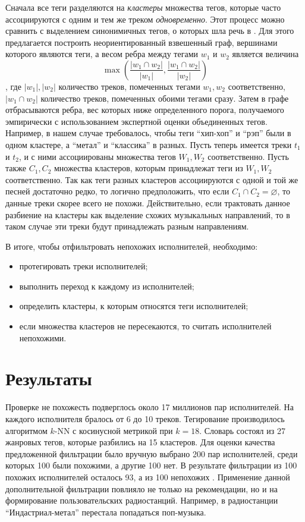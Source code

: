 Сначала все теги разделяются на \emph{кластеры} \ld множества тегов, которые
часто ассоциируются с одним и тем же треком \emph{одновременно}. Этот процесс можно сравнить с выделением синонимичных тегов, о которых
шла речь в \cite{msordo_thesis}. Для этого предлагается построить неориентированный взвешенный граф, вершинами которого являются теги, а весом ребра между
тегами $w_1$ и $w_2$ является величина
$$ \max \left ( \frac{|w_1 \cap w_2|}{|w_1|}, \frac{|w_1 \cap w_2|}{|w_2|} \right ) $$,
где $|w_1|, |w_2|$ \ld количество треков, помеченных тегами $w_1, w_2$ соответственно, $|w_1 \cap w_2|$ \ld количество треков, 
помеченных обоими тегами сразу. Затем в графе отбрасываются ребра, вес которых ниже определенного порога, получаемого эмпирически с 
использованием экспертной оценки объединенных тегов. Например, в нашем случае требовалось, чтобы теги ``хип-хоп'' и ``рэп''
были в одном кластере, а ``метал'' и ``классика'' \ld в разных. Пусть теперь имеется треки $t_1$ и $t_2$, и с ними ассоциированы множества тегов
$W_1, W_2$ соответственно. Пусть также $C_1, C_2$ \ld множества кластеров, которым принадлежат теги из $W_1, W_2$ соответственно. 
Так как теги разных кластеров ассоциируются с одной и той же песней достаточно редко, то логично предположить, что если $C_1 \cap C_2 = \varnothing$, 
то данные треки скорее всего не похожи. Действительно, если трактовать данное разбиение на кластеры как выделение схожих 
музыкальных направлений, то в таком случае эти треки будут принадлежать разным направлениям.

В итоге, чтобы отфильтровать непохожих исполнителей, необходимо:
\begin{itemize}
 \item протегировать треки исполнителей;
 \item выполнить переход к каждому из исполнителей;
 \item определить кластеры, к которым относятся теги исполнителей;
 \item если множества кластеров не пересекаются, то считать исполнителей непохожими.
\end{itemize}

\section{Результаты}

Проверке не похожесть подверглось около 17 миллионов пар исполнителей. На каждого исполнителя бралось от 6 до 10 треков. Тегирование производилось 
алгоритмом $k$-NN с косинусной метрикой при $k = 18$. Словарь состоял из 27 жанровых тегов, которые разбились на 15 кластеров.
Для оценки качества предложенной фильтрации было вручную выбрано 200 пар исполнителей, среди которых 100
были похожими, а другие 100 \ld нет. В результате фильтрации из 100 похожих исполнителей осталось 93, а из 100 непохожих .
Применение данной дополнительной фильтрации повлияло не только на рекомендации, но и на формирование пользовательских радиостанций.
Например, в радиостанции ``Индастриал-метал'' перестала попадаться поп-музыка.

